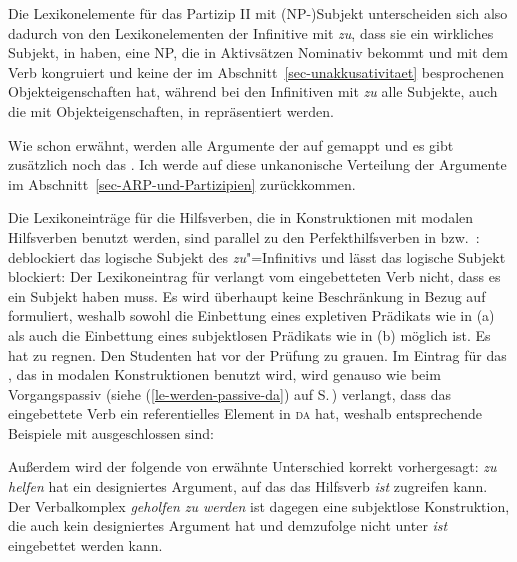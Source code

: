 {Die Lexikonelemente für das Partizip II mit (NP-)Subjekt unterscheiden sich also dadurch von den
Lexikonelementen der Infinitive mit \emph{zu}, dass sie ein wirkliches Subjekt, in \subj haben, \dash eine NP, die in
Aktivsätzen Nominativ bekommt und mit dem Verb kongruiert und keine der im
Abschnitt~\ref{sec-unakkusativitaet} besprochenen Objekteigenschaften hat,
während bei den Infinitiven mit \emph{zu} alle Subjekte, \dash auch die mit
Objekteigenschaften, in \subj repräsentiert werden.

Wie schon erwähnt, werden alle Argumente der \argstl auf \comps gemappt und es gibt zusätzlich noch das
\subjm. Ich werde auf diese unkanonische Verteilung der Argumente im Abschnitt~\ref{sec-ARP-und-Partizipien} zurückkommen.

Die Lexikoneinträge für die Hilfsverben, die in Konstruktionen mit modalen Hilfsverben
benutzt werden, sind parallel zu den Perfekthilfsverben in  bzw.\ : 
\haben deblockiert das logische Subjekt des \emph{zu}"=Infinitivs und \sein lässt
das logische Subjekt blockiert: Der Lexikoneintrag für \haben verlangt vom eingebetteten
Verb nicht, dass es ein Subjekt haben muss. Es wird überhaupt keine Beschränkung in Bezug auf \subj
formuliert, weshalb sowohl die Einbettung eines expletiven Prädikats 
wie in (a) als auch die Einbettung eines subjektlosen Prädikats wie in (b) möglich ist.
\eal
\ex 
Es hat zu regnen.
\ex 
Den Studenten hat vor der Prüfung zu grauen.
\zl
Im Eintrag für das \sein, das in modalen Konstruktionen benutzt wird, wird genauso wie beim
Vorgangspassiv (siehe (\ref{le-werden-passive-da}) auf S.\,\pageref{le-werden-passive-da})
verlangt, dass das eingebettete Verb ein referentielles Element in \textsc{da} hat, weshalb
entsprechende Beispiele mit \sein ausgeschlossen sind:
\eal
{}
\zl

\noindent
Außerdem wird der folgende von \citet[]{Haider90b} erwähnte Unterschied 
korrekt vorhergesagt:
\eal
{}
\zl
\emph{zu helfen} hat ein designiertes Argument, auf das das Hilfsverb \emph{ist} zugreifen kann.
Der Verbalkomplex \emph{geholfen zu werden} ist dagegen eine subjektlose Konstruktion,
die auch kein designiertes Argument hat und demzufolge nicht unter \emph{ist} eingebettet
werden kann.

}
